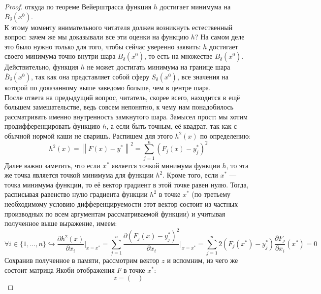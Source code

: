 \documentclass[11pt]{article}
\begin{document}
\begin{proof}
    откуда по теореме Вейерштрасса функция $h$ достигает минимума на $\overline{B}_{\delta}\left(x^0\right)$. 
    \\
    К этому моменту внимательного читателя должен возникнуть естественный вопрос: зачем же мы доказывали все эти оценки на функцию $h$? На самом деле это было нужно 
    только для того, чтобы сейчас уверенно заявить: $h$ достигает своего минимума точно внутри шара $\overline{B}_{\delta}\left(x^0\right)$, то есть на множестве $B_{\delta} \left(x^0\right)$.
    Действительно, функция $h$ не может достигать минимума на границе шара $\overline{B}_{\delta}\left(x^0\right)$, так как она представляет собой сферу $S_{\delta} \left(x^0\right)$, все значения на которой по доказанному выше 
    заведомо больше, чем в центре шара.
    \\
    После ответа на предыдущий вопрос, читатель, скорее всего, находится в ещё большем замешательстве, ведь совсем непонятно, к чему нам понадобилось рассматривать именно внутренность замкнутого шара. Замысел прост: 
    мы хотим продифференцировать функцию $h$, а если быть точным, её квадрат, так как с обычной нормой каши не сваришь. Распишем для этого $h^2(x)$ по определению: 
    \[h^2(x) = \left\lVert F(x) - y^{\ast} \right\rVert^2 = \sum_{j = 1}^n \left(F_j (x) - y^{\ast}_j \right)^2\]
    Далее важно заметить, что если $x^{\ast}$ является точкой минимума функции $h$, то эта же точка 
    является точкой минимума для функции $h^2$. Кроме того, если $x^{\ast}$ --- точка минимума функции, то её вектор градиент в этой точке равен нулю. Тогда, расписывая равенство нулю градиента функции $h^2$ в точке $x^{\ast}$ (по третьему необходимому условию дифференцируемости этот вектор состоит из частных производных по всем аргументам рассматриваемой функции) и учитывая полученное выше выражение, имеем:
    \begin{equation*} \label{eq:th:1.2:1} \tag{$\ast$}
        \forall i \in \{1, \ldots, n\} \hookrightarrow \frac{\partial h^2(x)}{\partial x_i} \Bigg|_{x = x^{\ast}} = \sum_{j = 1}^n \frac{\partial \left(F_j(x) - y_j^{\ast} \right)^2}{\partial x_i} \Bigg|_{x = x^{\ast}} = 
    \sum_{j = 1}^n 2 \left(F_j(x^{\ast}) - y_j^{\ast} \right) \frac{\partial F_j}{\partial x_i} \left(x^{\ast}\right) = 0
    \end{equation*}
    Сохранив полученное в памяти, рассмотрим вектор $z$ и вспомним, из чего же состоит матрица Якоби отображения $F$ в точке $x^{\ast}$:
    \begin{equation*}
        z = 
        \begin{pmatrix}

\end{pmatrix}
\end{equation*}
\end{proof}
\end{document}
